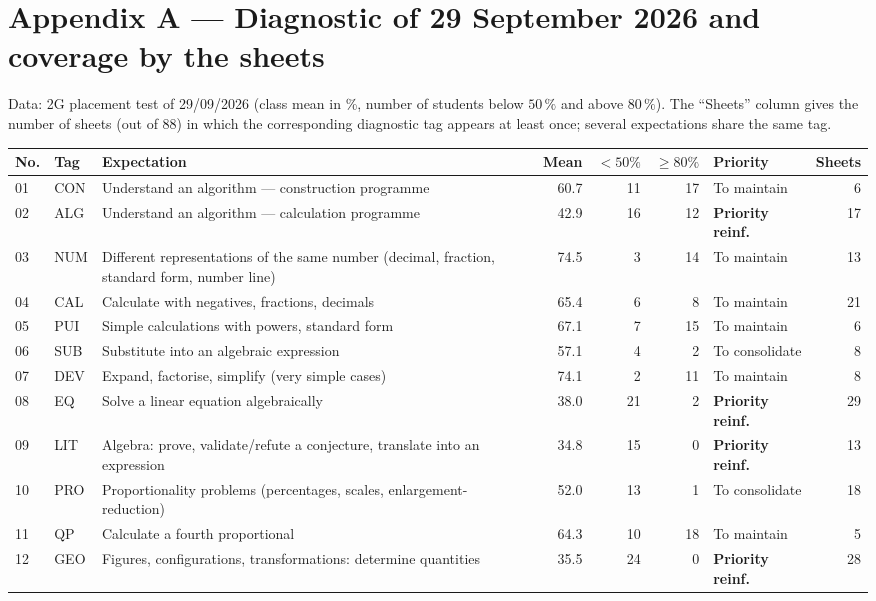 \section{Appendix A — Diagnostic of 29 September 2026 and coverage by the sheets}
Data: 2G placement test of 29/09/2026 (class mean in \%, number of students below $50\,\%$ and above $80\,\%$). The ``Sheets'' column gives the number of sheets (out of $88$) in which the corresponding diagnostic tag appears at least once; several expectations share the same tag.\par\smallskip
{\footnotesize\renewcommand{\arraystretch}{1.15}\begin{tabular}{@{}l l p{7.6cm} r r r l r@{}}\toprule
No. & Tag & Expectation & Mean & $<50\%$ & $\geqslant80\%$ & Priority & Sheets \\ \midrule
01 & CON & Understand an algorithm — construction programme & 60.7 & 11 & 17 & To maintain & 6 \\
02 & ALG & Understand an algorithm — calculation programme & 42.9 & 16 & 12 & \textbf{Priority reinf.} & 17 \\
03 & NUM & Different representations of the same number (decimal, fraction, standard form, number line) & 74.5 & 3 & 14 & To maintain & 13 \\
04 & CAL & Calculate with negatives, fractions, decimals & 65.4 & 6 & 8 & To maintain & 21 \\
05 & PUI & Simple calculations with powers, standard form & 67.1 & 7 & 15 & To maintain & 6 \\
06 & SUB & Substitute into an algebraic expression & 57.1 & 4 & 2 & To consolidate & 8 \\
07 & DEV & Expand, factorise, simplify (very simple cases) & 74.1 & 2 & 11 & To maintain & 8 \\
08 & EQ & Solve a linear equation algebraically & 38.0 & 21 & 2 & \textbf{Priority reinf.} & 29 \\
09 & LIT & Algebra: prove, validate/refute a conjecture, translate into an expression & 34.8 & 15 & 0 & \textbf{Priority reinf.} & 13 \\
10 & PRO & Proportionality problems (percentages, scales, enlargement-reduction) & 52.0 & 13 & 1 & To consolidate & 18 \\
11 & QP & Calculate a fourth proportional & 64.3 & 10 & 18 & To maintain & 5 \\
12 & GEO & Figures, configurations, transformations: determine quantities & 35.5 & 24 & 0 & \textbf{Priority reinf.} & 28 \\

\end{tabular}}
